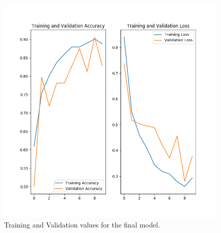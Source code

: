 \documentclass[runningheads,a4paper,11pt]{report}
\begin{document}
\begin{figure}[H]
	\caption{Training and Validation values for the final model.}
	\includegraphics[trim={0 0 0 1cm},clip,width=15cm]{training_and_validation.png}
	\centering
\end{figure}
\end{document}
